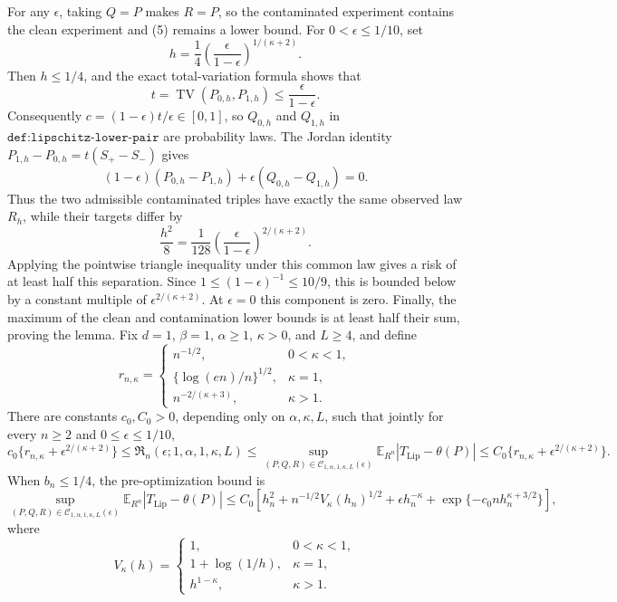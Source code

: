 For any \(\epsilon\), taking \(Q=P\) makes \(R=P\), so the contaminated experiment contains the clean experiment and (5) remains a lower bound. For \(0<\epsilon\leq1/10\), set
\[
h=\frac14\left(\frac{\epsilon}{1-\epsilon}\right)^{1/(\kappa+2)}.
\]
Then \(h\leq1/4\), and the exact total-variation formula shows that
\[
t=\operatorname{TV}(P_{0,h},P_{1,h})
\leq\frac{\epsilon}{1-\epsilon}.
\]
Consequently \(c=(1-\epsilon)t/\epsilon\in[0,1]\), so \(Q_{0,h}\) and \(Q_{1,h}\) in \(\texttt{def:lipschitz-lower-pair}\) are probability laws. The Jordan identity \(P_{1,h}-P_{0,h}=t(S_+-S_-)\) gives
\[
(1-\epsilon)(P_{0,h}-P_{1,h})
+\epsilon(Q_{0,h}-Q_{1,h})=0.
\]
Thus the two admissible contaminated triples have exactly the same observed law \(R_h\), while their targets differ by
\[
\frac{h^2}{8}=\frac1{128}
\left(\frac{\epsilon}{1-\epsilon}\right)^{2/(\kappa+2)}.
\]
Applying the pointwise triangle inequality under this common law gives a risk of at least half this separation. Since \(1\leq(1-\epsilon)^{-1}\leq10/9\), this is bounded below by a constant multiple of \(\epsilon^{2/(\kappa+2)}\). At \(\epsilon=0\) this component is zero. Finally, the maximum of the clean and contamination lower bounds is at least half their sum, proving the lemma.
Fix \(d=1\), \(\beta=1\), \(\alpha\geq1\), \(\kappa>0\), and \(L\geq4\), and define
\[
r_{n,\kappa}=
\begin{cases}
n^{-1/2},&0<\kappa<1,\\
\{\log(en)/n\}^{1/2},&\kappa=1,\\
n^{-2/(\kappa+3)},&\kappa>1.
\end{cases}
\]
There are constants \(c_0,C_0>0\), depending only on \(\alpha,\kappa,L\), such that jointly for every \(n\geq2\) and \(0\leq\epsilon\leq1/10\),
\[
c_0\{r_{n,\kappa}+\epsilon^{2/(\kappa+2)}\}
\leq\mathfrak R_n(\epsilon;1,\alpha,1,\kappa,L)
\leq\sup_{(P,Q,R)\in\mathcal C_{1,\alpha,1,\kappa,L}(\epsilon)}
\mathbb E_{R^n}|T_{\mathrm{Lip}}-\theta(P)|
\leq C_0\{r_{n,\kappa}+\epsilon^{2/(\kappa+2)}\}.
\]
When \(b_n\leq1/4\), the pre-optimization bound is
\[
\sup_{(P,Q,R)\in\mathcal C_{1,\alpha,1,\kappa,L}(\epsilon)}
\mathbb E_{R^n}|T_{\mathrm{Lip}}-\theta(P)|
\leq C_0\left[
h_n^2+n^{-1/2}V_\kappa(h_n)^{1/2}
+\epsilon h_n^{-\kappa}
+\exp\{-c_0nh_n^{\kappa+3/2}\}
\right],
\]
where
\[
V_\kappa(h)=
\begin{cases}
1,&0<\kappa<1,\\
1+\log(1/h),&\kappa=1,\\
h^{1-\kappa},&\kappa>1.
\end{cases}
\]
